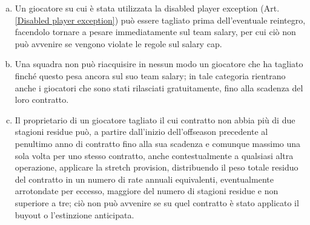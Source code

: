 \documentclass{article}
\begin{document}
\begin{enumerate}[(a)]
\item Un giocatore su cui è stata utilizzata la disabled player exception (Art. \ref{Disabled player exception}) può essere tagliato prima dell'eventuale reintegro, facendolo tornare a pesare immediatamente sul team salary, per cui ciò non può avvenire se vengono violate le regole sul salary cap.
\item Una squadra non può riacquisire in nessun modo un giocatore che ha tagliato finché questo pesa ancora sul suo team salary; in tale categoria rientrano anche i giocatori che sono stati rilasciati gratuitamente, fino alla scadenza del loro contratto.
\item Il proprietario di un giocatore tagliato il cui contratto non abbia più di due stagioni residue può, a partire dall'inizio dell'offseason precedente al penultimo anno di contratto fino alla sua scadenza e comunque massimo una sola volta per uno stesso contratto, anche contestualmente a qualsiasi altra operazione, applicare la stretch provision, distribuendo il peso totale residuo del contratto in un numero di rate annuali equivalenti, eventualmente arrotondate per eccesso, maggiore del numero di stagioni residue e non superiore a tre; ciò non può avvenire se su quel contratto è stato applicato il buyout o l'estinzione anticipata.
\end{enumerate}
\end{document}
